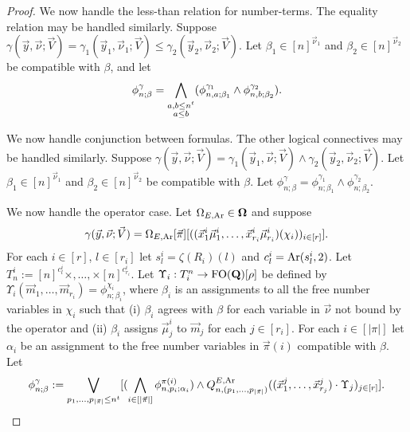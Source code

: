 \documentclass[../main/thesis.tex]{subfiles}
\begin{document}
\begin{proof}
  We now handle the less-than relation for number-terms. The equality relation
  may be handled similarly. Suppose $\gamma(\vec{y}, \vec{\nu}; \vec{V}) =
  \gamma_1(\vec{y}_1, \vec{\nu}_1; \vec{V}) \leq \gamma_2 (\vec{y}_2,
  \vec{\nu}_2 ; \vec{V})$. Let $\beta_1 \in [n]^{\vec{\nu}_1}$ and $\beta_2 \in
  [n]^{\vec{\nu}_2}$ be compatible with $\beta$, and let
  \begin{align*}
    \phi^{\gamma}_{n; \beta} = \underset{\substack{a, b \leq n^t \\ a \leq
    b}}{\bigwedge} (\phi^{\gamma_1}_{n, a; \beta_1} \land \phi^{\gamma_2}_{n, b;
    \beta_2}).
  \end{align*}
  
  We now handle conjunction between formulas. The other logical connectives may
  be handled similarly. Suppose $\gamma(\vec{y}, \vec{\nu}; \vec{V}) =
  \gamma_1(\vec{y}_1, \vec{\nu} ; \vec{V}) \land \gamma_2 (\vec{y}_2,
  \vec{\nu}_2 ; \vec{V})$. Let $\beta_1 \in [n]^{\vec{\nu}_1}$ and $\beta_2 \in
  [n]^{\vec{\nu}_2}$ be compatible with $\beta$. Let $\phi^{\gamma}_{n ; \beta}
  = \phi^{\gamma_1}_{n ; \beta_1} \land \phi^{\gamma_2}_{n ; \beta_2}$.

  We now handle the operator case. Let $\Omega_{E, \text{\upshape Ar}} \in \mathbf{\mathbf{\Omega}}$ and suppose
  \begin{align*}
    \gamma(\vec{y}, \vec{\nu}; \vec{V}) = \Omega_{E, \text{\upshape Ar}} [\vec{\pi}] [((\vec{x}^i_1 \vec{\mu}^i_1, \ldots, \vec{x}^i_{r_i} \vec{\mu}^i_{r_i})(\chi_i))_{i \in [r]}].
  \end{align*}
  For each $i \in [r]$, $l \in [r_i]$ let $s^i_l = \zeta(R_i)(l)$ and $c^i_l =
  \text{\upshape Ar}(s^i_l, 2)$. Let $T^i_n := [n]^{c^i_l} \times , \ldots, \times
  [n]^{c^i_{r_i}}$. Let $\Upsilon_i : T^n_i \rightarrow \text{\upshape FO}(\mathbf{Q})[\rho]$ be defined
  by $\Upsilon_i (\vec{m}_1, \ldots, \vec{m}_{r_i}) = \phi^{\chi_i}_{n ;
    \beta_i}$, where $\beta_i$ is an assignments to all the free number
  variables in $\chi_i$ such that (i) $\beta_i$ agrees with $\beta$ for each
  variable in $\vec{\nu}$ not bound by the operator and (ii) $\beta_i$ assigns
  $\vec{\mu}^i_{j}$ to $\vec{m}_j$ for each $j \in [r_i]$. For each $i \in
  [\vert \pi \vert]$ let $\alpha_i$ be an assignment to the free number
  variables in $\vec{\pi}(i)$ compatible with $\beta$. Let
  \begin{align*}
    \phi^{\gamma}_{n; \beta} := \bigvee_{p_1, \ldots, p_{\vert \vec{\pi} \vert} \leq n^t}[(\bigwedge_{i \in [\vert \vec{\pi}\vert]} \phi^{\pi(i)}_{n, p_i; \alpha_i}) \land Q^{E, \text{\upshape Ar}}_{n, (p_1, \ldots, p_{\vert \vec{\pi} \vert})} ((\vec{x}^{j}_1, \ldots, \vec{x}^{j}_{r_j}) \cdot \Upsilon_j)_{j \in [r]}].
  \end{align*}
  

\end{proof}
\end{document}
